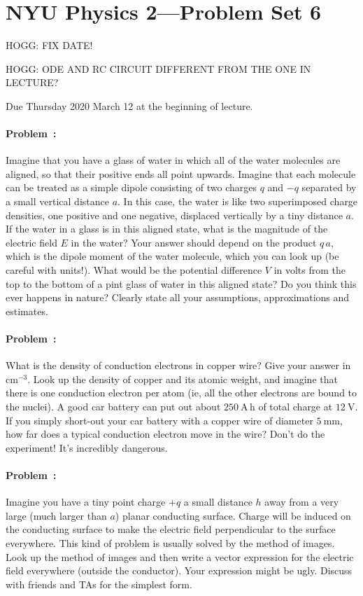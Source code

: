 \documentclass[12pt]{article}
\begin{document}
\section*{NYU Physics 2---Problem Set 6}

HOGG: FIX DATE!

HOGG: ODE AND RC CIRCUIT DIFFERENT FROM THE ONE IN LECTURE?

Due Thursday 2020 March 12 at the beginning of lecture.

\paragraph{Problem~\theproblem:}%
Imagine that you have a glass of water in which all of the water
molecules are aligned, so that their positive ends all point upwards.
Imagine that each molecule can be treated as a simple dipole
consisting of two charges $q$ and $-q$ separated by a small vertical
distance $a$.  In this case, the water is like two superimposed charge
densities, one positive and one negative, displaced vertically by a
tiny distance $a$.  If the water in a glass is in this aligned state,
what is the magnitude of the electric field $E$ in the water?  Your
answer should depend on the product $q\,a$, which is the dipole moment
of the water molecule, which you can look up (be careful with units!).  What would
be the potential difference $V$ in volts from the top to the bottom of
a pint glass of water in this aligned state? Do you think this ever
happens in nature? Clearly state all your assumptions, approximations
and estimates.

\paragraph{Problem~\theproblem:}%
What is the density of conduction electrons in copper wire?  Give your
answer in $\mathrm{cm^{-3}}$.  Look up the density of copper and its
atomic weight, and imagine that there is one conduction electron per
atom (ie, all the other electrons are bound to the nuclei).  A good
car battery can put out about $250~\mathrm{A\,h}$ of total charge at
$12~\mathrm{V}$.  If you simply short-out your car battery with a
copper wire of diameter $5~\mathrm{mm}$, how far does a typical
conduction electron move in the wire? Don't do the experiment! It's
incredibly dangerous.

\paragraph{Problem~\theproblem:}%
Imagine you have a tiny point charge $+q$ a small distance $h$ away
from a very large (much larger than $a$) planar conducting surface. Charge
will be induced on the conducting surface to make the electric field
perpendicular to the surface everywhere. This kind of problem is usually
solved by the method of images. Look up the method of images and
then write a vector expression for the electric field everywhere (outside
the conductor). Your expression might be ugly. Discuss with friends and
TAs for the simplest form.
\end{document}
